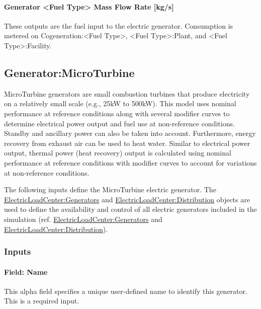 \paragraph{Generator \textless{}Fuel Type\textgreater{} Mass Flow Rate {[}kg/s{]}}\label{generator-fuel-type-mass-flow-rate-kgs-1}

These outputs are the fuel input to the electric generator. Consumption is metered on Cogeneration:\textless{}Fuel Type\textgreater{}, \textless{}Fuel Type\textgreater{}:Plant, and \textless{}Fuel Type\textgreater{}:Facility.

\subsection{Generator:MicroTurbine}\label{generatormicroturbine}

MicroTurbine generators are small combustion turbines that produce electricity on a relatively small scale (e.g., 25kW to 500kW). This model uses nominal performance at reference conditions along with several modifier curves to determine electrical power output and fuel use at non-reference conditions. Standby and ancillary power can also be taken into account. Furthermore, energy recovery from exhaust air can be used to heat water. Similar to electrical power output, thermal power (heat recovery) output is calculated using nominal performance at reference conditions with modifier curves to account for variations at non-reference conditions.

The following inputs define the MicroTurbine electric generator. The \hyperref[electricloadcentergenerators]{ElectricLoadCenter:Generators} and \hyperref[electricloadcenterdistribution]{ElectricLoadCenter:Distribution} objects are used to define the availability and control of all electric generators included in the simulation (ref. \hyperref[electricloadcentergenerators]{ElectricLoadCenter:Generators} and \hyperref[electricloadcenterdistribution]{ElectricLoadCenter:Distribution}).

\subsubsection{Inputs}\label{inputs-9-004}

\paragraph{Field: Name}\label{field-name-10-003}

This alpha field specifies a unique user-defined name to identify this generator. This is a required input.

